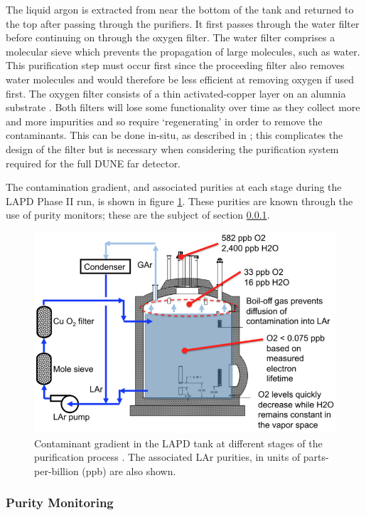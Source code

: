 The liquid argon is extracted from near the bottom of the tank and returned to the top after passing through the purifiers.  It first passes through the water filter before continuing on through the oxygen filter.  The water filter comprises a molecular sieve which prevents the propagation of large molecules, such as water.  This purification step must occur first since the proceeding filter also removes water molecules and would therefore be less efficient at removing oxygen if used first.  The oxygen filter consists of a thin activated-copper layer on an alumnia substrate \cite{LArFilter}.  Both filters will lose some functionality over time as they collect more and more impurities and so require `regenerating' in order to remove the contaminants.  This can be done in-situ, as described in \cite{LArFilter}; this complicates the design of the filter but is necessary when considering the purification system required for the full DUNE far detector.

The contamination gradient, and associated purities at each stage during the LAPD Phase II run, is shown in figure \ref{fig:LAPDPurity}.  These purities are known through the use of purity monitors; these are the subject of section \ref{sec:PurityMonitoring}.

\begin{figure}[ht]
  \centering
  \includegraphics[width=12cm]{LAPDPurity.png}
  \caption{Contaminant gradient in the LAPD tank at different stages of the purification process \cite{LAPD}.  The associated LAr purities, in units of parts-per-billion (ppb) are also shown.}
  \label{fig:LAPDPurity}
\end{figure}

\subsubsection{Purity Monitoring}\label{sec:PurityMonitoring}

